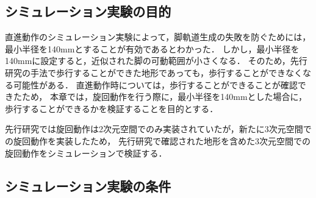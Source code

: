 
\subsection{シミュレーション実験の目的}
直進動作のシミュレーション実験によって，脚軌道生成の失敗を防ぐためには，最小半径を140mmとすることが有効であるとわかった．
しかし，最小半径を140mmに設定すると，近似された脚の可動範囲が小さくなる．
そのため，先行研究の手法で歩行することができた地形であっても，歩行することができなくなる可能性がある．
直進動作時については，歩行することができることが確認できたため，
本章では，旋回動作を行う際に，最小半径を140mmとした場合に，歩行することができるかを検証することを目的とする．

先行研究では旋回動作は2次元空間でのみ実装されていたが，新たに3次元空間での旋回動作を実装したため，
先行研究で確認された地形を含めた3次元空間での旋回動作をシミュレーションで検証する．

\subsection{シミュレーション実験の条件}